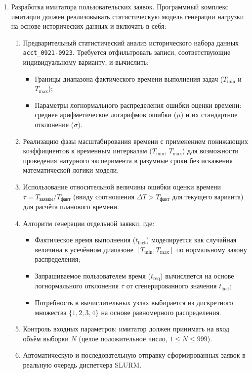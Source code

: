 \begin{enumerate}
    \item Разработка имитатора пользовательских заявок. Программный комплекс имитации должен реализовывать статистическую модель генерации нагрузки на основе исторических данных и включать в себя:
    \begin{enumerate}
        \item Предварительный статистический анализ исторического набора данных \texttt{acct\_0921-0923}. Требуется отфильтровать записи, соответствующие индивидуальному варианту, и вычислить:
        \begin{itemize}
            \item Границы диапазона фактического времени выполнения задач ($T_{\text{min}}$ и $T_{\text{max}}$);
            \item Параметры логнормального распределения ошибки оценки времени: среднее арифметическое логарифмов ошибки ($\mu$) и их стандартное отклонение ($\sigma$).
        \end{itemize}
        \item Реализацию фазы масштабирования времени с применением понижающих коэффициентов к временным интервалам ($T_{\text{min}}$, $T_{\text{max}}$) для возможности проведения натурного эксперимента в разумные сроки без искажения математической логики модели.
        \item Использование относительной величины ошибки оценки времени $\tau = T_{\text{заявки}} / T_{\text{факт}}$ (ввиду соотношения $\Delta T > T_{\text{факт}}$ для текущего варианта) для расчёта планового времени.
        \item Алгоритм генерации отдельной заявки, где:
        \begin{itemize}
            \item Фактическое время выполнения ($t_{\text{fact}}$) моделируется как случайная величина в усечённом диапазоне $[T_{\text{min}}, T_{\text{max}}]$ по нормальному закону распределения;
            \item Запрашиваемое пользователем время ($t_{\text{req}}$) вычисляется на основе логнормального отклонения $\tau$ от сгенерированного значения $t_{\text{fact}}$;
            \item Потребность в вычислительных узлах выбирается из дискретного множества $\{1, 2, 3, 4\}$ на основе равномерного распределения.
        \end{itemize}
        \item Контроль входных параметров: имитатор должен принимать на вход объём выборки $N$ (целое положительное число, $1 \le N \le 999$).
        \item Автоматическую и последовательную отправку сформированных заявок в реальную очередь диспетчера SLURM.
    \end{enumerate}


\end{enumerate}
